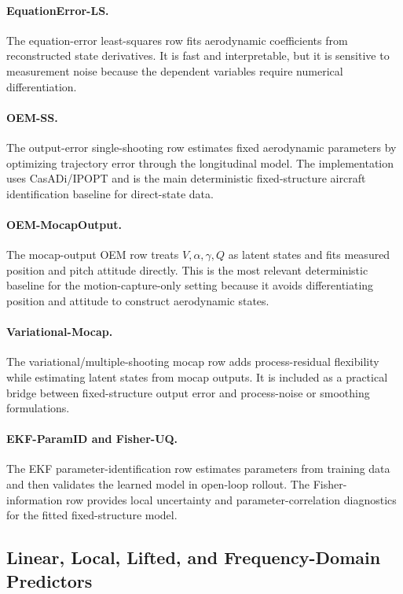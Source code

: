 \documentclass[11pt]{article}
\begin{document}
\paragraph{EquationError-LS.}
The equation-error least-squares row fits aerodynamic coefficients from reconstructed state derivatives. It is fast and interpretable, but it is sensitive to measurement noise because the dependent variables require numerical differentiation.

\paragraph{OEM-SS.}
The output-error single-shooting row estimates fixed aerodynamic parameters by optimizing trajectory error through the longitudinal model. The implementation uses CasADi/IPOPT and is the main deterministic fixed-structure aircraft identification baseline for direct-state data.

\paragraph{OEM-MocapOutput.}
The mocap-output OEM row treats $V,\alpha,\gamma,Q$ as latent states and fits measured position and pitch attitude directly. This is the most relevant deterministic baseline for the motion-capture-only setting because it avoids differentiating position and attitude to construct aerodynamic states.

\paragraph{Variational-Mocap.}
The variational/multiple-shooting mocap row adds process-residual flexibility while estimating latent states from mocap outputs. It is included as a practical bridge between fixed-structure output error and process-noise or smoothing formulations.

\paragraph{EKF-ParamID and Fisher-UQ.}
The EKF parameter-identification row estimates parameters from training data and then validates the learned model in open-loop rollout. The Fisher-information row provides local uncertainty and parameter-correlation diagnostics for the fitted fixed-structure model.

\subsection{Linear, Local, Lifted, and Frequency-Domain Predictors}
\end{document}

